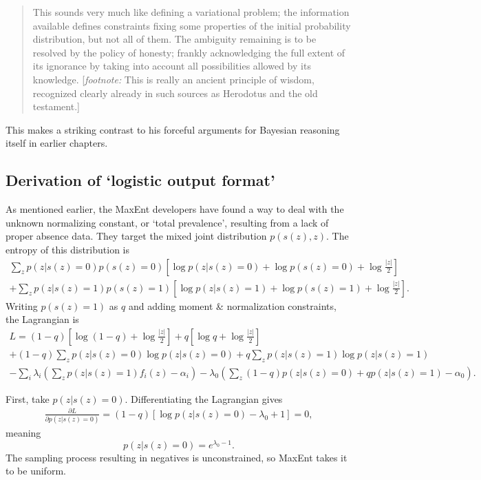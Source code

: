\begin{itemize}
\begin{quote}
    This sounds very much like defining a variational problem; the information available defines constraints fixing some properties of the initial probability distribution, but not all of them. The ambiguity remaining is to be resolved by the policy of honesty; frankly acknowledging the full extent of its ignorance by taking into account all possibilities allowed by its knowledge. [\emph{footnote:} This is really an ancient principle of wisdom, recognized clearly already in such sources as Herodotus and the old testament.]
\end{quote}
This makes a striking contrast to his forceful arguments for Bayesian reasoning itself in earlier chapters.
\end{itemize}

\subsection{Derivation of `logistic output format'}
\label{sec:logistic-output-derivation} 

As mentioned earlier, the MaxEnt developers have found a way to deal with the unknown normalizing constant, or `total prevalence', resulting from a lack of proper absence data. They target the mixed joint distribution $p(s(z),z)$. The entropy of this distribution is
\begin{eqnarray*}
    \sum_z p(z|s(z)=0)p(s(z)=0)\left[\log p(z|s(z)=0) + \log p(s(z)=0) + \log \frac{|z|}{2}\right]\\
    +\sum_z p(z|s(z)=1)p(s(z)=1)\left[\log p(z|s(z)=1) + \log p(s(z)=1) + \log \frac{|z|}{2}\right].
\end{eqnarray*}
Writing $p(s(z)=1)$ as $q$ and adding moment \& normalization constraints, the Lagrangian is
\begin{eqnarray*}
    L=(1-q)\left[\log(1-q)+ \log \frac{|z|}{2}\right] + q\left[\log q+ \log \frac{|z|}{2}\right]\\
    +(1-q)\sum_z p(z|s(z)=0)\log p(z|s(z)=0) + q\sum_z p(z|s(z)=1)\log p(z|s(z)=1)\\
    -\sum_i \lambda_i \left(\sum_z p(z|s(z)=1) f_i(z)-\alpha_i\right) - \lambda_0 \left(\sum_z (1-q)p(z|s(z)=0) + qp(z|s(z)=1) -\alpha_0\right).
\end{eqnarray*}

\bigskip
First, take $p(z|s(z)=0)$. Differentiating the Lagrangian gives
\begin{eqnarray*}
    \frac{\partial L}{\partial p(z|s(z)=0)} = (1-q)\left[\log p(z|s(z)=0)-\lambda_0+1\right]=0,
\end{eqnarray*}
meaning
\begin{equation}
    \label{eq:negs-are-uniform}
    p(z|s(z)=0)=e^{\lambda_0-1}.
\end{equation}
The sampling process resulting in negatives is unconstrained, so MaxEnt takes it to be uniform.

